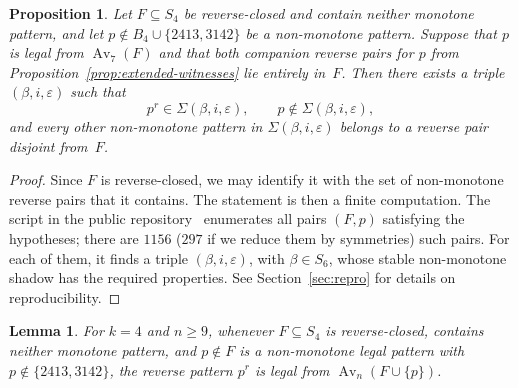 \documentclass[11pt]{amsart}
\newcommand{\Sym}{S}
\newcommand{\Av}{\operatorname{Av}}
\theoremstyle{plain}
\newtheorem{proposition}[theorem]{Proposition}
\newtheorem{lemma}[theorem]{Lemma}
\theoremstyle{definition}
\theoremstyle{remark}
\begin{document}
\begin{proposition}\label{prop:residual-nonhard-inflations}
  Let $F \subseteq \Sym_4$ be reverse-closed and contain neither monotone pattern, and let
  $p \notin B_4 \cup \{2413,3142\}$ be a non-monotone pattern.  Suppose that $p$ is legal from
  $\Av_7(F)$ and that both companion reverse pairs for $p$ from
  Proposition~\ref{prop:extended-witnesses} lie entirely in~$F$.  Then there exists a triple
  $(\beta,i,\varepsilon)$ such that
  \[
    p^r \in \Sigma(\beta,i,\varepsilon),\qquad p \notin \Sigma(\beta,i,\varepsilon),
  \]
  and every other non-monotone pattern in $\Sigma(\beta,i,\varepsilon)$ belongs to a reverse pair
  disjoint from~$F$.
\end{proposition}

\begin{proof}
  Since $F$ is reverse-closed, we may identify it with the set of non-monotone reverse pairs that it
  contains.  The statement is then a finite  computation.  The script
   in the public repository~\cite{game-patterns-repo}
  enumerates all pairs $(F,p)$ satisfying the hypotheses; there are
  $1156$ ($297$ if we reduce them by symmetries) such pairs.  For each of them, it finds a triple $(\beta,i,\varepsilon)$,
  with $\beta \in \Sym_6$, whose stable
  non-monotone shadow has the required properties.  See Section~\ref{sec:repro} for details on reproducibility.
\end{proof}

\begin{lemma}\label{lem:reverse-reply-legality}
  For $k=4$ and $n \geq 9$, whenever $F \subseteq \Sym_4$ is reverse-closed, contains neither
  monotone pattern, and $p \notin F$ is a non-monotone legal pattern with
  $p \notin \{2413,3142\}$, the reverse pattern $p^r$ is legal from $\Av_n(F \cup \{p\})$.
\end{lemma}
\end{document}
